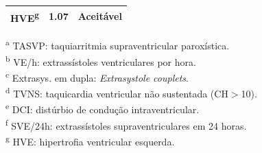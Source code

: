 \begin{table}[htbp]
{\begin{tabular}{lcc}
			HVE\textsuperscript{g}                & 1.07  & Aceit\'avel                                      \\
			\bottomrule
		\end{tabular}%
	}
	\begin{flushleft}
		\footnotesize
		\textsuperscript{a} TASVP: taquiarritmia supraventricular paroxística.\\
		\textsuperscript{b} VE/h: extrassístoles ventriculares por hora.\\
		\textsuperscript{c} Extrasys. em dupla: \textit{Extrasystole couplets}.\\
		\textsuperscript{d} TVNS: taquicardia ventricular não sustentada (CH$>$10).\\
		\textsuperscript{e} DCI: distúrbio de condução intraventricular.\\
		\textsuperscript{f} SVE/24h: extrassístoles supraventriculares em 24 horas.\\
		\textsuperscript{g} HVE: hipertrofia ventricular esquerda.
	\end{flushleft}
\end{table}

\FloatBarrier


